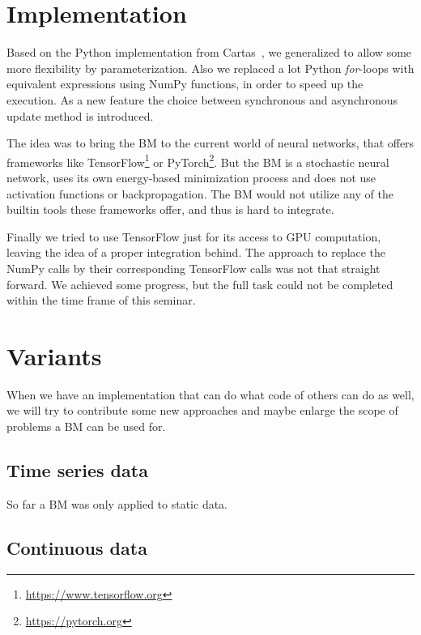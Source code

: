 \documentclass[12pt,twoside]{article}
\theoremstyle{plain}
\theoremstyle{definition}
\theoremstyle{remark}
\begin{document}
\section{Implementation}
\label{sec:impl}

Based on the Python implementation from Cartas~\cite{BMImpl}, we generalized to allow some more flexibility by parameterization. Also we replaced a lot Python \textit{for}-loops with equivalent expressions using NumPy functions, in order to speed up the execution. As a new feature the choice between synchronous and asynchronous update method is introduced.

The idea was to bring the BM to the current world of neural networks, that offers frameworks like TensorFlow\footnote{\url{https://www.tensorflow.org}} or PyTorch\footnote{\url{https://pytorch.org}}. But the BM is a stochastic neural network, uses its own energy-based minimization process and does not use activation functions or backpropagation. The BM would not utilize any of the builtin tools these frameworks offer, and thus is hard to integrate. 

Finally we tried to use TensorFlow just for its access to GPU computation, leaving the idea of a proper integration behind. The approach to replace the NumPy calls by their corresponding TensorFlow calls was not that straight forward. We achieved some progress, but the full task could not be completed within the time frame of this seminar.


\section{Variants}
\label{sec:variants}

When we have an implementation that can do what code of others can do as well, we will try to contribute some new approaches and maybe enlarge the scope of problems a BM can be used for.


\subsection{Time series data}
\label{sec:variants:subsec:timeseries}

So far a BM was only applied to static data.


\subsection{Continuous data}
\label{sec:variants:subsec:continuous}
\end{document}
